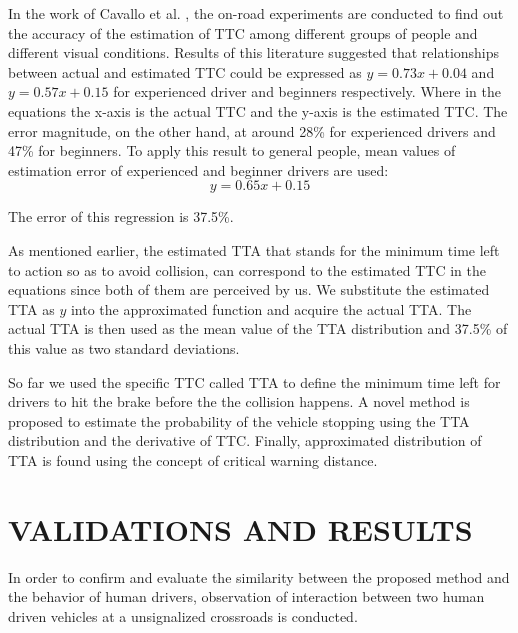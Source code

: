 \documentclass[twocolumn,10pt]{asme2e}
\begin{document}
In the work of Cavallo et al. \cite{TTC}, the on-road experiments are conducted to find out the accuracy of the estimation of TTC among different groups of people and different visual conditions. Results of this literature suggested that relationships between actual and estimated TTC could be expressed as $y = 0.73x+0.04$ and $y=0.57x+0.15$ for experienced driver and beginners respectively. Where in the equations the x-axis is the actual TTC and the y-axis is the estimated TTC. The error magnitude, on the other hand, at around 28\% for experienced drivers and 47\% for beginners. To apply this result to general people, mean values of estimation error of experienced and beginner drivers are used: 
\begin{equation}
y = 0.65x+0.15
\label{TTA_mean}
\end{equation}

The error of this regression is 37.5\%.

As mentioned earlier, the estimated TTA that stands for the minimum time left to action so as to avoid collision, can correspond to the estimated TTC in the equations since both of them are perceived by us. We substitute the estimated TTA as $y$ into the approximated function and acquire the actual TTA. The actual TTA is then used as the mean value of the TTA distribution and 37.5\% of this value as two standard deviations.

So far we used the specific TTC called TTA to define the minimum time left for drivers to hit the brake before the the collision happens. A novel method is proposed to estimate the probability of the vehicle stopping using the TTA distribution and the derivative of TTC. Finally, approximated distribution of TTA is found using the concept of critical warning distance.

\section{VALIDATIONS AND RESULTS}
In order to confirm and evaluate the similarity between the proposed method and the behavior of human drivers, observation of interaction between two human driven vehicles at a unsignalized crossroads is conducted.
\end{document}
